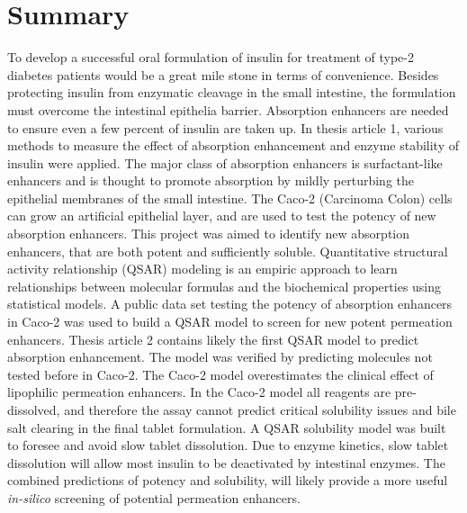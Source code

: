 \chapter{Summary}
To develop a successful oral formulation of insulin for treatment of type-2 diabetes patients would be a great mile stone in terms of convenience. Besides protecting insulin from enzymatic cleavage in the small intestine, the formulation must overcome the intestinal epithelia barrier. Absorption enhancers are needed to ensure even a few percent of insulin are taken up. In thesis article 1, various methods to measure the effect of absorption enhancement and enzyme stability of insulin were applied. The major class of absorption enhancers is surfactant-like enhancers and is thought to promote absorption by mildly perturbing the epithelial membranes of the small intestine. The Caco-2 (Carcinoma Colon) cells can grow an artificial epithelial layer, and are used to test the potency of new absorption enhancers. This project was aimed to identify new absorption enhancers, that are both potent and sufficiently soluble. Quantitative structural activity relationship (QSAR) modeling is an empiric approach to learn relationships between molecular formulas and the biochemical properties using statistical models. A public data set testing the potency of absorption enhancers in Caco-2 was used to build a QSAR model to screen for new potent permeation enhancers. Thesis article 2 contains likely the first QSAR model to predict absorption enhancement. The model was verified by predicting molecules not tested before in Caco-2. The Caco-2 model overestimates the clinical effect of lipophilic permeation enhancers. 
In the Caco-2 model all reagents are pre-dissolved, and therefore the assay cannot predict critical solubility issues and bile salt clearing in the final tablet formulation. A QSAR solubility model was built to foresee and avoid slow tablet dissolution. Due to enzyme kinetics, slow tablet dissolution will allow most insulin to be deactivated by intestinal enzymes. The combined predictions of potency and solubility, will likely provide a more useful \textit{in-silico} screening of potential permeation enhancers.

